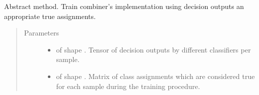 \documentclass[letterpaper,10pt,english]{sphinxmanual}
\begin{document}
\begin{fulllineitems}
\begin{fulllineitems}
\end{fulllineitems}


\begin{fulllineitems}
\label{\detokenize{pusion.core.combiner:pusion.core.combiner.TrainableCombiner.train}}
\sphinxAtStartPar
Abstract method. Train combiner’s implementation using decision outputs an appropriate true assignments.
\begin{quote}\begin{description}
\item[{Parameters}] \leavevmode\begin{itemize}
\item {} 
\sphinxAtStartPar
{} \textendash{}  of shape .
Tensor of decision outputs by different classifiers per sample.

\item {} 
\sphinxAtStartPar
{} \textendash{}  of shape .
Matrix of class assignments which are considered true for each sample during the training procedure.

\end{itemize}

\end{description}\end{quote}

\end{fulllineitems}


\end{fulllineitems}

\end{document}
